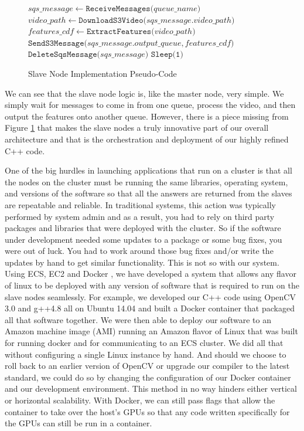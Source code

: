 \begin{figure}[h]

\begin{algorithmic}[1]

    \State $sqs\_message \gets \texttt{ReceiveMessages(} queue\_name \texttt{)}$ 
    \State $video\_path \gets \texttt{DownloadS3Video(} sqs\_message.video\_path \texttt{)}$
    \State $features\_cdf \gets \texttt{ExtractFeatures(} video\_path \texttt{)}$ 
    \State $\texttt{SendS3Message(} sqs\_message.output\_queue, features\_cdf \texttt{)}$
    \State $\texttt{DeleteSqsMessage(} sqs\_message \texttt{)}$ 
    \State $\texttt{Sleep(1)}$
  \EndWhile
\end{algorithmic}
\caption{Slave Node Implementation Pseudo-Code}
\label{alg:slave_node}
\end{figure}

We can see that the slave node logic is, like the master node, very simple. We
simply wait for messages to come in from one queue, process the video, and then
output the features onto another queue. However, there is a piece missing from
Figure \ref{alg:slave_node} that makes the slave nodes a truly innovative
part of our overall architecture and that is the orchestration and deployment
of our highly refined C++ code.

One of the big hurdles in launching applications that run on a cluster is that
all the nodes on the cluster must be running the same libraries, operating
system,  and versions of the software so that all the answers are returned from
the slaves are repeatable and reliable. In traditional systems, this action was
typically performed by system admin and as a result, you had to rely on third
party packages and libraries that were deployed with the cluster. So if the
software under development needed some updates to a package or some bug fixes,
you were out of luck. You had  to work around those bug fixes and/or write the
updates by hand to get similar  functionality. This is not so with our system.
Using ECS, EC2 and Docker \cite{Merkel:2014:DLL:2600239.2600241}, we  have
developed a system that allows any flavor of linux to be deployed with any
version of software that is required to run on the slave nodes seamlessly. For
example, we developed our C++ code using OpenCV 3.0 and g++4.8 all on Ubuntu
14.04 and built a Docker container that packaged all that software together.
We were then able to deploy our software to an Amazon machine image (AMI) running
an Amazon flavor of Linux that was built for running docker and for communicating
to an ECS cluster. We did all that without configuring a single Linux instance
by hand. And should we choose to roll back to an earlier version of OpenCV or
upgrade our compiler to the latest standard, we could do so by changing the
configuration of our Docker container and our development environment. This
method in no way hinders either vertical or horizontal scalability. With Docker,
we can still pass flags that allow the container to take over the host's GPUs
so that any code written specifically for the GPUs can still be run in a container.


